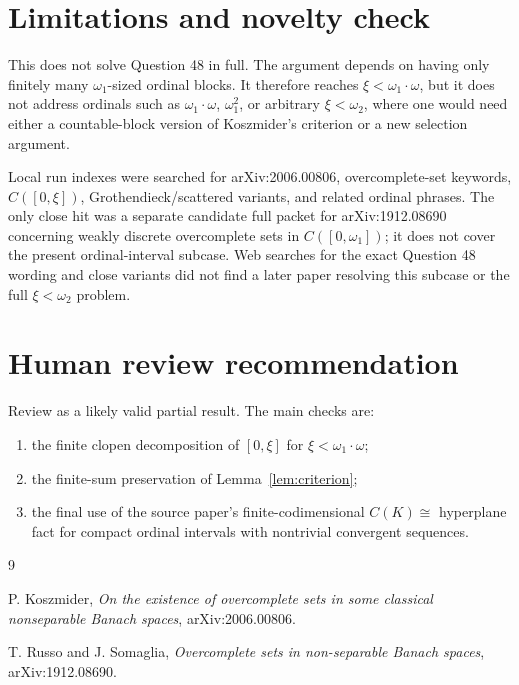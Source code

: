 \documentclass[11pt]{article}
\begin{document}
\section{Limitations and novelty check}

This does not solve Question 48 in full. The argument depends on having only
finitely many \(\omega_1\)-sized ordinal blocks. It therefore reaches
\(\xi<\omega_1\cdot\omega\), but it does not address ordinals such as
\(\omega_1\cdot\omega\), \(\omega_1^2\), or arbitrary \(\xi<\omega_2\), where
one would need either a countable-block version of Koszmider's criterion or a
new selection argument.

Local run indexes were searched for arXiv:2006.00806, overcomplete-set
keywords, \(C([0,\xi])\), Grothendieck/scattered variants, and related ordinal
phrases. The only close hit was a separate candidate full packet for
arXiv:1912.08690 concerning weakly discrete overcomplete sets in
\(C([0,\omega_1])\); it does not cover the present ordinal-interval subcase.
Web searches for the exact Question 48 wording and close variants did not find
a later paper resolving this subcase or the full \(\xi<\omega_2\) problem.

\section{Human review recommendation}

Review as a likely valid partial result. The main checks are:
\begin{enumerate}
\item the finite clopen decomposition of \([0,\xi]\) for
      \(\xi<\omega_1\cdot\omega\);
\item the finite-sum preservation of Lemma~\ref{lem:criterion};
\item the final use of the source paper's finite-codimensional
      \(C(K)\cong\) hyperplane fact for compact ordinal intervals with
      nontrivial convergent sequences.
\end{enumerate}

\begin{thebibliography}{9}

P. Koszmider,
\emph{On the existence of overcomplete sets in some classical nonseparable
Banach spaces},
arXiv:2006.00806.

T. Russo and J. Somaglia,
\emph{Overcomplete sets in non-separable Banach spaces},
arXiv:1912.08690.

\end{thebibliography}
\end{document}
